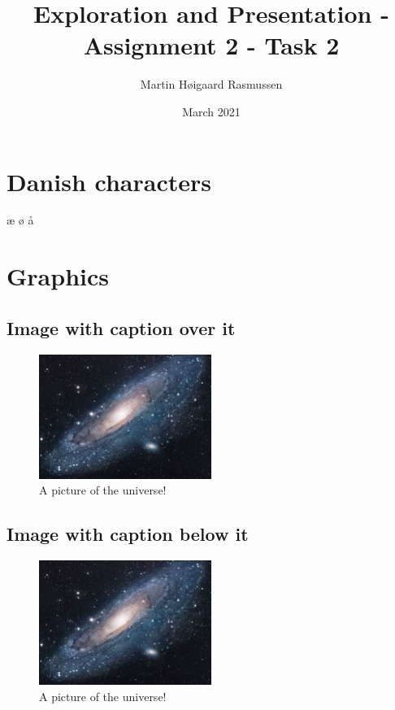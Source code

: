 \documentclass{article}
\title{Exploration and Presentation - Assignment 2 - Task 2}
\author{Martin Høigaard Rasmussen }
\date{March 2021}
\begin{document}
\maketitle

\tableofcontents

\section{Danish characters}
æ ø å

\section{Graphics}

\subsection{Image with caption over it}
\begin{figure}[!ht]
  \centering
  \caption{A picture of the universe!}
  \includegraphics[width=0.5\textwidth]{universe}
\end{figure}

\subsection{Image with caption below it}

\begin{figure}[!ht]
  \centering
  \includegraphics[width=0.5\textwidth]{universe}
    \caption{A picture of the universe!}
\end{figure}
\end{document}

